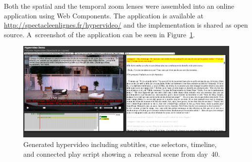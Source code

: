 \documentclass[conference]{IEEEtran}
\newcommand{\todo}[1]{\noindent\textcolor{red}{{\bf \{ToDo} #1{\bf \}}}}
\begin{document}
Both the spatial and the temporal zoom lenses were assembled into 
an online  application using Web Components. The application is available at \url{http://spectacleenlignes.fr/hypervideo/}  and the implementation is  shared as open source. A~screenshot of the application can be seen in Figure~\ref{fig:screenshot}.

\begin{figure}[htb!]
  \centering
  \includegraphics[width=0.95\linewidth]{screenshot}
  \caption{Generated hypervideo including subtitles, cue selectors, timeline, and connected play script
    showing a~rehearsal scene from day~40.}
  \label{fig:screenshot}
\end{figure}





\end{document}
